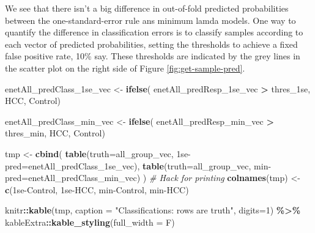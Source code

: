 \documentclass[
]{book}
\newenvironment{Shaded}{\begin{snugshade}}{\end{snugshade}}
\newcommand{\CommentTok}[1]{\textcolor[rgb]{0.56,0.35,0.01}{\textit{#1}}}
\newcommand{\DataTypeTok}[1]{\textcolor[rgb]{0.13,0.29,0.53}{#1}}
\newcommand{\DecValTok}[1]{\textcolor[rgb]{0.00,0.00,0.81}{#1}}
\newcommand{\KeywordTok}[1]{\textcolor[rgb]{0.13,0.29,0.53}{\textbf{#1}}}
\newcommand{\NormalTok}[1]{#1}
\newcommand{\OperatorTok}[1]{\textcolor[rgb]{0.81,0.36,0.00}{\textbf{#1}}}
\newcommand{\StringTok}[1]{\textcolor[rgb]{0.31,0.60,0.02}{#1}}
\begin{document}
We see that there isn't a big difference in out-of-fold predicted
probabilities between the one-standard-error rule ans minimum lamda models.
One way to quantify
the difference in classification errors is to classify samples
according to each vector of predicted probabilities, setting
the thresholds to achieve a fixed false positive rate, 10\% say.
These thresholds are indicated by the grey lines in the scatter plot
on the right side of Figure \ref{fig:get-sample-pred}.

\begin{Shaded}
\begin{Highlighting}[]
\NormalTok{enetAll\_predClass\_1se\_vec <{-}}\StringTok{ }\KeywordTok{ifelse}\NormalTok{(}
\NormalTok{ enetAll\_predResp\_1se\_vec }\OperatorTok{>}\StringTok{ }\NormalTok{thres\_1se, }\StringTok{\textquotesingle{}HCC\textquotesingle{}}\NormalTok{, }\StringTok{\textquotesingle{}Control\textquotesingle{}}\NormalTok{)}

\NormalTok{enetAll\_predClass\_min\_vec <{-}}\StringTok{ }\KeywordTok{ifelse}\NormalTok{(}
\NormalTok{ enetAll\_predResp\_min\_vec }\OperatorTok{>}\StringTok{ }\NormalTok{thres\_min, }\StringTok{\textquotesingle{}HCC\textquotesingle{}}\NormalTok{, }\StringTok{\textquotesingle{}Control\textquotesingle{}}\NormalTok{)}

\NormalTok{tmp <{-}}\StringTok{ }\KeywordTok{cbind}\NormalTok{(}
 \KeywordTok{table}\NormalTok{(}\DataTypeTok{truth=}\NormalTok{all\_group\_vec, }\StringTok{\textasciigrave{}}\DataTypeTok{1se{-}pred}\StringTok{\textasciigrave{}}\NormalTok{=enetAll\_predClass\_1se\_vec),}
 \KeywordTok{table}\NormalTok{(}\DataTypeTok{truth=}\NormalTok{all\_group\_vec, }\StringTok{\textasciigrave{}}\DataTypeTok{min{-}pred}\StringTok{\textasciigrave{}}\NormalTok{=enetAll\_predClass\_min\_vec)}
\NormalTok{) }
\CommentTok{\# Hack for printing}
\KeywordTok{colnames}\NormalTok{(tmp) <{-}}\StringTok{ }\KeywordTok{c}\NormalTok{(}\StringTok{\textquotesingle{}1se{-}Control\textquotesingle{}}\NormalTok{, }\StringTok{\textquotesingle{}1se{-}HCC\textquotesingle{}}\NormalTok{, }\StringTok{\textquotesingle{}min{-}Control\textquotesingle{}}\NormalTok{, }\StringTok{\textquotesingle{}min{-}HCC\textquotesingle{}}\NormalTok{)}

\NormalTok{knitr}\OperatorTok{::}\KeywordTok{kable}\NormalTok{(tmp,}
  \DataTypeTok{caption =} \StringTok{"Classifications: rows are truth"}\NormalTok{,}
  \DataTypeTok{digits=}\DecValTok{1}\NormalTok{) }\OperatorTok{\%>\%}
\StringTok{   }\NormalTok{kableExtra}\OperatorTok{::}\KeywordTok{kable\_styling}\NormalTok{(}\DataTypeTok{full\_width =}\NormalTok{ F)}
\end{Highlighting}
\end{Shaded}
\end{document}
